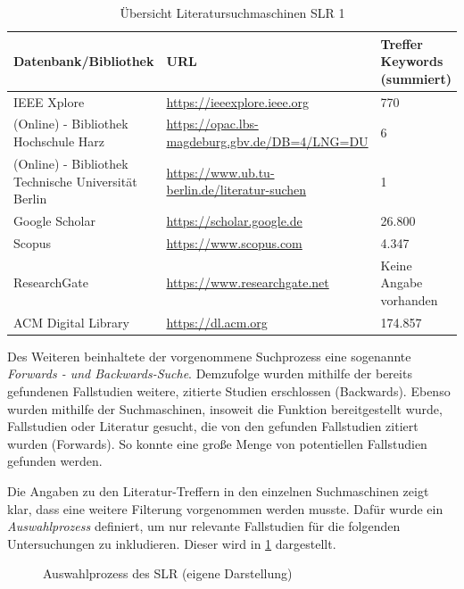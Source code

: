 \begin{table}[ht]
	\centering
	\caption{Übersicht Literatursuchmaschinen SLR 1}
	\begin{tabular}{|p{5cm}|p{7cm}||p{3cm}|}
		\hline
		\textbf{Datenbank/Bibliothek}& \textbf{URL} &  \textbf{Treffer Keywords  (summiert)} \\
		\hline
		IEEE Xplore & \url{https://ieeexplore.ieee.org} & 770 \\
		(Online) - Bibliothek Hochschule Harz & \url{https://opac.lbs-magdeburg.gbv.de/DB=4/LNG=DU} & 6 \\
		(Online) - Bibliothek Technische Universität Berlin  & \url{https://www.ub.tu-berlin.de/literatur-suchen}& 1 \\
		Google Scholar &  \url{https://scholar.google.de}  & 26.800 \\
		Scopus & \url{https://www.scopus.com} & 4.347 \\
		ResearchGate & \url{https://www.researchgate.net} &Keine Angabe vorhanden \footnotemark \\ 
		ACM Digital Library & \url{https://dl.acm.org} & 174.857 \\
		\hline
	\end{tabular}
	\label{tab:suchmaschinenslr1}
\end{table}


Des Weiteren beinhaltete der vorgenommene Suchprozess eine sogenannte \textit{Forwards - und Backwards-Suche}. Demzufolge wurden mithilfe der bereits gefundenen Fallstudien weitere, zitierte Studien erschlossen (Backwards). Ebenso wurden mithilfe der Suchmaschinen, insoweit die Funktion bereitgestellt wurde, Fallstudien oder Literatur gesucht, die von den gefunden Fallstudien zitiert wurden (Forwards). So konnte eine große Menge von potentiellen Fallstudien  gefunden werden.

Die Angaben zu den Literatur-Treffern in den einzelnen Suchmaschinen zeigt klar, dass eine weitere Filterung vorgenommen werden musste. Dafür wurde ein \textit{Auswahlprozess} definiert, um nur relevante Fallstudien für die folgenden Untersuchungen zu inkludieren. Dieser wird in \ref{fig:auswahlprozess} dargestellt.

\begin{figure}[H]
	\centering
	\caption[Auswahlprozess des SLR]{Auswahlprozess des SLR (eigene Darstellung)}
	\label{fig:auswahlprozess}
\end{figure}

